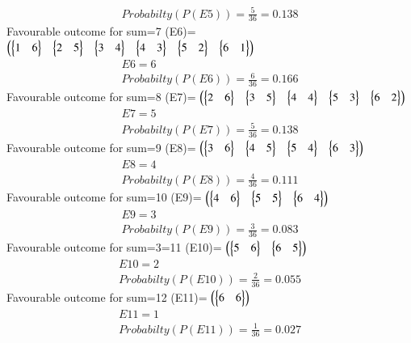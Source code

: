 \begin{enumerate}[label=\arabic*.,ref=\thesubsubsection.\theenumi]
\begin{enumerate}
\begin{align}
Probabilty(P(E5))=\frac{5}{36}=0.138
\end{align}
Favourable outcome for sum=7 (E6)= 
$\begin{pmatrix}\begin{Bmatrix}1&6\end{Bmatrix}&\begin{Bmatrix}2&5\end{Bmatrix}&\begin{Bmatrix}3&4\end{Bmatrix}&\begin{Bmatrix}4&3\end{Bmatrix}&\begin{Bmatrix}5&2\end{Bmatrix}&\begin{Bmatrix}6&1\end{Bmatrix}\end{pmatrix}$
\begin{align}
E6=6
\\
Probabilty(P(E6))=\frac{6}{36}=0.166
\end{align}
Favourable outcome for sum=8 (E7)= 
$\begin{pmatrix}\begin{Bmatrix}2&6\end{Bmatrix}&\begin{Bmatrix}3&5\end{Bmatrix}&\begin{Bmatrix}4&4\end{Bmatrix}&\begin{Bmatrix}5&3\end{Bmatrix}&\begin{Bmatrix}6&2\end{Bmatrix}\end{pmatrix}$
\begin{align}
E7=5
\\
Probabilty(P(E7))=\frac{5}{36}=0.138
\end{align}
Favourable outcome for sum=9 (E8)= 
$\begin{pmatrix}\begin{Bmatrix}3&6\end{Bmatrix}&\begin{Bmatrix}4&5\end{Bmatrix}&\begin{Bmatrix}5&4\end{Bmatrix}&\begin{Bmatrix}6&3\end{Bmatrix}\end{pmatrix}$
\begin{align}
E8=4
\\
Probabilty(P(E8))=\frac{4}{36}=0.111
\end{align}
Favourable outcome for sum=10 (E9)= 
$\begin{pmatrix}\begin{Bmatrix}4&6\end{Bmatrix}&\begin{Bmatrix}5&5\end{Bmatrix}&\begin{Bmatrix}6&4\end{Bmatrix}\end{pmatrix}$
\begin{align}
E9=3 
\\
Probabilty(P(E9))=\frac{3}{36}=0.083
\end{align}
Favourable outcome for sum=3=11 (E10)= 
$\begin{pmatrix}\begin{Bmatrix}5&6\end{Bmatrix}&\begin{Bmatrix}6&5\end{Bmatrix}\end{pmatrix}$
\begin{align}
E10=2
\\
Probabilty(P(E10))=\frac{2}{36}=0.055
\end{align}
Favourable outcome for sum=12 (E11)=
$\begin{pmatrix}\begin{Bmatrix}6&6\end{Bmatrix}\end{pmatrix}$
\begin{align}
E11=1
\\
Probabilty(P(E11))=\frac{1}{36}=0.027
\end{align}


\end{enumerate}
\end{enumerate}
